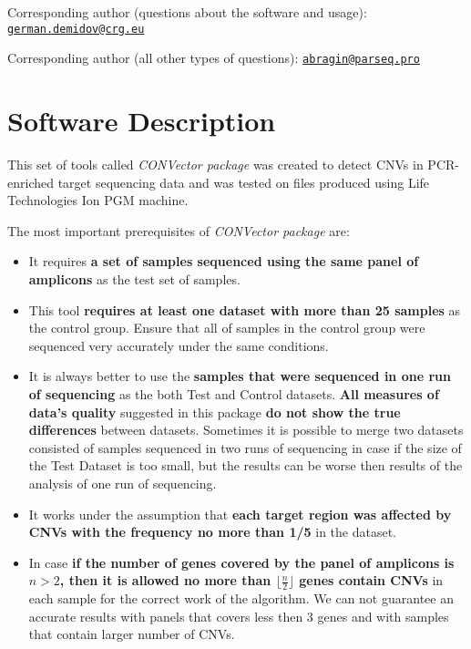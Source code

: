 \documentclass{article}
\begin{document}
Corresponding author (questions about the software and usage): \href{mailto:german.demidov@crg.eu}{\nolinkurl{german.demidov@crg.eu}}

Corresponding author (all other types of questions): \href{mailto:abragin@parseq.pro}{\nolinkurl{abragin@parseq.pro}}

\newpage
\section{Software Description}

This set of tools called {\it CONVector package} was created to detect CNVs in PCR-enriched target sequencing data and was tested on files produced using Life Technologies Ion{\texttrademark} PGM machine.

The most important prerequisites of {\it CONVector package} are:

\begin{itemize}
\item It requires {\bf a set of samples sequenced using the same panel of amplicons} as the test set of samples.
\item This tool {\bf requires at least one dataset with more than 25 samples} as the control group. Ensure that all of samples in the control group were sequenced very accurately under the same conditions.
\item It is always better to use the {\bf samples that were sequenced in one run of sequencing} as the both Test and Control datasets. {\bf All measures of data's quality} suggested in this package {\bf do not show the true differences} between datasets. Sometimes it is possible to merge two datasets consisted of samples sequenced in two runs of sequencing in case if the size of the Test Dataset is too small, but the results can be worse then results of the analysis of one run of sequencing.
\item It works under the assumption that {\bf each target region was affected by CNVs with the frequency no more than 1/5} in the dataset.
\item In case {\bf if the number of genes covered by the panel of amplicons is $n > 2$, then it is allowed no more than $\lfloor \frac{n}{2} \rfloor$ genes contain CNVs} in each sample for the correct work of the algorithm. We can not guarantee an accurate results with panels that covers less then 3 genes and with samples that contain larger number of CNVs.
\end{itemize}
\end{document}
